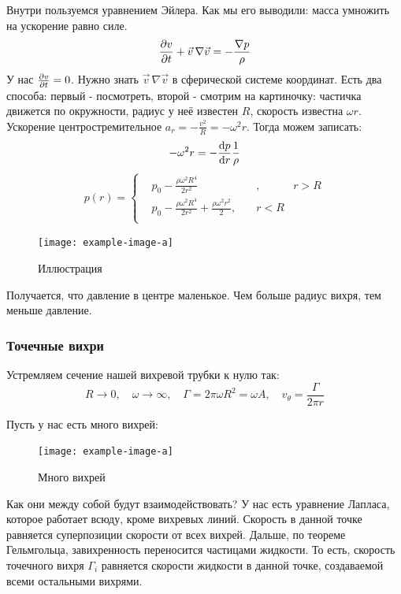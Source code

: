 Внутри пользуемся уравнением Эйлера. Как мы его выводили: масса умножить на ускорение равно силе.
\begin{equation}
	\pdv{v}{t}+\vec{v}\,\nabla\vec{v}=-\frac{\nabla p}{\rho}
\end{equation}
У нас $\pdv{v}{t}=0$. Нужно знать $\vec{v}\,\nabla\vec{v}$ в сферической системе координат. Есть два способа: первый - посмотреть, второй - смотрим на картиночку: частичка движется по окружности, радиус у неё известен $R$, скорость известна $\omega r$. Ускорение центростремительное $a_r=-\frac{v^2}{R}=-\omega^2 r$. Тогда можем записать:
\begin{equation}
	-\omega^2 r  = - \dv{p}{r}\frac{1}{\rho}
\end{equation}
\begin{equation}
	p(r)=\left\{
	\begin{aligned}
		&p_0-\frac{\rho\omega^2 R^4}{2r^2}&, \quad& r>R\\
		&p_0-\frac{\rho\omega^2 R^4}{2r^2}+\frac{\rho\omega^2 r^2}{2}, \quad& r<R\\
	\end{aligned}
	\right.
\end{equation}
\begin{figure}[h!]
    \centering
    \texttt{[image: example-image-a]}
    \caption{Иллюстрация}
    \label{fig:figure1}
\end{figure}
Получается, что давление в центре маленькое. Чем больше радиус вихря, тем меньше давление.




\subsubsection{Точечные вихри}

Устремляем сечение нашей вихревой трубки к нулю так:
\begin{equation}
	R\to0, \quad \omega\to\infty, \quad \Gamma=2\pi \omega R^2 =\omega A, \quad v_\theta=\frac{\Gamma}{2\pi r}
\end{equation}

Пусть у нас есть много вихрей: 
\begin{figure}[h!]
    \centering
    \texttt{[image: example-image-a]}
    \caption{Много вихрей}
    \label{fig:figure1}
\end{figure}
Как они между собой будут взаимодействовать? У нас есть уравнение Лапласа, которое работает всюду, кроме вихревых линий. Скорость в данной точке равняется суперпозиции скорости от всех вихрей. Дальше, по теореме Гельмгольца, завихренность переносится частицами жидкости. То есть, скорость точечного вихря $\Gamma_i$ равняется скорости жидкости в данной точке, создаваемой всеми остальными вихрями. 


